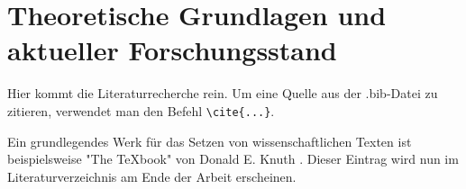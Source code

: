
\chapter{Theoretische Grundlagen und aktueller Forschungsstand}
\label{chap:theorie}

Hier kommt die Literaturrecherche rein. Um eine Quelle aus der
.bib-Datei zu zitieren, verwendet man den Befehl \verb|\cite{...}|.

Ein grundlegendes Werk für das Setzen von wissenschaftlichen Texten ist
beispielsweise "The TeXbook" von Donald E. Knuth \cite{knuth1984texbook}.
Dieser Eintrag wird nun im Literaturverzeichnis am Ende der Arbeit erscheinen.